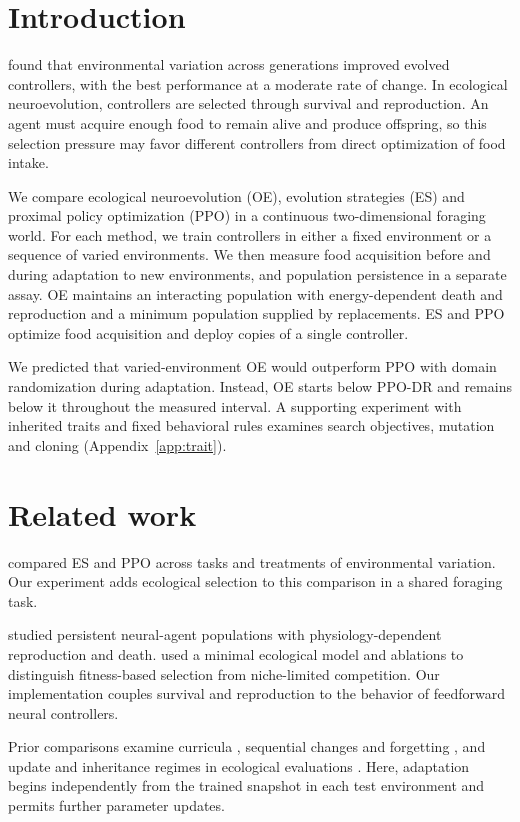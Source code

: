 \section{Introduction}
\citet{milano2019moderate} found that environmental variation across generations improved evolved controllers, with the best performance at a moderate rate of change. In ecological neuroevolution, controllers are selected through survival and reproduction. An agent must acquire enough food to remain alive and produce offspring, so this selection pressure may favor different controllers from direct optimization of food intake.

We compare ecological neuroevolution (OE), evolution strategies (ES) and proximal policy optimization (PPO) in a continuous two-dimensional foraging world. For each method, we train controllers in either a fixed environment or a sequence of varied environments. We then measure food acquisition before and during adaptation to new environments, and population persistence in a separate assay. OE maintains an interacting population with energy-dependent death and reproduction and a minimum population supplied by replacements. ES and PPO optimize food acquisition and deploy copies of a single controller.

We predicted that varied-environment OE would outperform PPO with domain randomization during adaptation. Instead, OE starts below PPO-DR and remains below it throughout the measured interval. A supporting experiment with inherited traits and fixed behavioral rules examines search objectives, mutation and cloning (Appendix~\ref{app:trait}).

\section{Related work}
\citet{milano2024qualitative} compared ES and PPO across tasks and treatments of environmental variation. Our experiment adds ecological selection to this comparison in a shared foraging task.

\citet{hamon2023eco} studied persistent neural-agent populations with physiology-dependent reproduction and death. \citet{nisioti2022plasticity} used a minimal ecological model and ablations to distinguish fitness-based selection from niche-limited competition. Our implementation couples survival and reproduction to the behavior of feedforward neural controllers.

Prior comparisons examine curricula \citep{nisioti2025transfer}, sequential changes and forgetting \citep{nisioti2026continual}, and update and inheritance regimes in ecological evaluations \citep{ge2026arena}. Here, adaptation begins independently from the trained snapshot in each test environment and permits further parameter updates.

